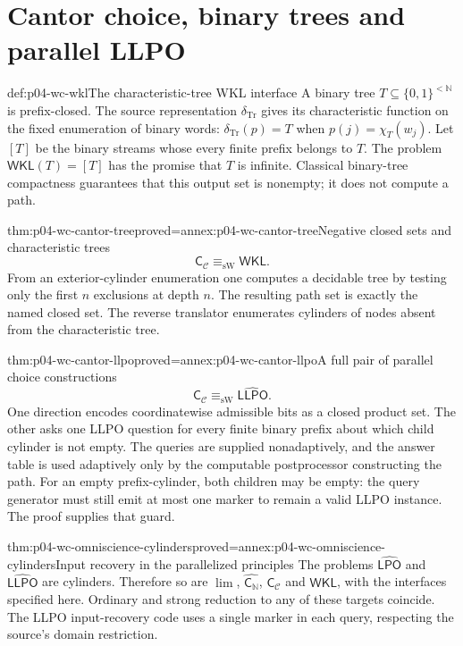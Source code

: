\section{Cantor choice, binary trees and parallel LLPO}
\label{sec:p04-wc-cantor}

\begin{hbdefinition}{def:p04-wc-wkl}{The characteristic-tree WKL interface}
A binary tree \(T\subseteq\{0,1\}^{<\mathbb N}\) is prefix-closed.
The source representation \(\delta_{\mathrm{Tr}}\) gives its
characteristic function on the fixed enumeration of binary words:
\(\delta_{\mathrm{Tr}}(p)=T\) when \(p(j)=\chi_T(w_j)\).
Let \([T]\) be the binary streams whose every finite prefix belongs
to \(T\). The problem \(\mathsf{WKL}(T)=[T]\) has the promise
that \(T\) is infinite. Classical binary-tree compactness guarantees
that this output set is nonempty; it does not compute a path.
\end{hbdefinition}

\begin{hbtheorem}{thm:p04-wc-cantor-tree}{proved=annex:p04-wc-cantor-tree}{Negative closed sets and characteristic trees}
\[
 \mathsf{C}_{\mathcal C}\equiv_{\mathrm{sW}}\mathsf{WKL}.
\]
From an exterior-cylinder enumeration one computes a decidable tree by
testing only the first \(n\) exclusions at depth \(n\).
The resulting path set is exactly the named closed set.
The reverse translator enumerates cylinders of nodes absent from the
characteristic tree.
\end{hbtheorem}

\begin{hbtheorem}{thm:p04-wc-cantor-llpo}{proved=annex:p04-wc-cantor-llpo}{A full pair of parallel choice constructions}
\[
 \mathsf{C}_{\mathcal C}\equiv_{\mathrm{sW}}\widehat{\mathsf{LLPO}}.
\]
One direction encodes coordinatewise admissible bits as a closed product
set. The other asks one LLPO question for every finite binary prefix
about which child cylinder is not empty. The queries are supplied
nonadaptively, and the answer table is used adaptively only by the
computable postprocessor constructing the path.
For an empty prefix-cylinder, both children may be empty: the query
generator must still emit at most one marker to remain a valid LLPO
instance. The proof supplies that guard.
\end{hbtheorem}

\begin{hbtheorem}{thm:p04-wc-omniscience-cylinders}{proved=annex:p04-wc-omniscience-cylinders}{Input recovery in the parallelized principles}
The problems \(\widehat{\mathsf{LPO}}\) and
\(\widehat{\mathsf{LLPO}}\) are cylinders. Therefore so are
\(\lim\), \(\widehat{\mathsf{C}_{\mathbb N}}\),
\(\mathsf{C}_{\mathcal C}\) and \(\mathsf{WKL}\), with the interfaces
specified here. Ordinary and strong reduction to any of these targets
coincide. The LLPO input-recovery code uses a single marker in each
query, respecting the source's domain restriction.
\end{hbtheorem}


